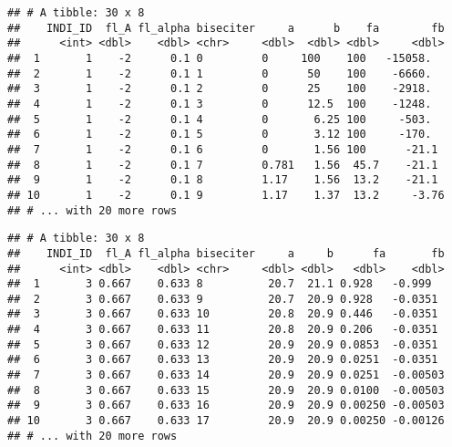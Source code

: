 \documentclass[
]{book}
\newenvironment{Shaded}{\begin{snugshade}}{\end{snugshade}}
\newcommand{\DecValTok}[1]{\textcolor[rgb]{0.00,0.00,0.81}{#1}}
\newcommand{\KeywordTok}[1]{\textcolor[rgb]{0.13,0.29,0.53}{\textbf{#1}}}
\newcommand{\NormalTok}[1]{#1}
\newcommand{\OperatorTok}[1]{\textcolor[rgb]{0.81,0.36,0.00}{\textbf{#1}}}
\newcommand{\StringTok}[1]{\textcolor[rgb]{0.31,0.60,0.02}{#1}}
\begin{document}
\begin{Shaded}
\end{Shaded}

\begin{verbatim}
## # A tibble: 30 x 8
##    INDI_ID  fl_A fl_alpha biseciter     a      b    fa        fb
##      <int> <dbl>    <dbl> <chr>     <dbl>  <dbl> <dbl>     <dbl>
##  1       1    -2      0.1 0         0     100    100   -15058.  
##  2       1    -2      0.1 1         0      50    100    -6660.  
##  3       1    -2      0.1 2         0      25    100    -2918.  
##  4       1    -2      0.1 3         0      12.5  100    -1248.  
##  5       1    -2      0.1 4         0       6.25 100     -503.  
##  6       1    -2      0.1 5         0       3.12 100     -170.  
##  7       1    -2      0.1 6         0       1.56 100      -21.1 
##  8       1    -2      0.1 7         0.781   1.56  45.7    -21.1 
##  9       1    -2      0.1 8         1.17    1.56  13.2    -21.1 
## 10       1    -2      0.1 9         1.17    1.37  13.2     -3.76
## # ... with 20 more rows
\end{verbatim}

\begin{Shaded}
\end{Shaded}

\begin{verbatim}
## # A tibble: 30 x 8
##    INDI_ID  fl_A fl_alpha biseciter     a     b      fa       fb
##      <int> <dbl>    <dbl> <chr>     <dbl> <dbl>   <dbl>    <dbl>
##  1       3 0.667    0.633 8          20.7  21.1 0.928   -0.999  
##  2       3 0.667    0.633 9          20.7  20.9 0.928   -0.0351 
##  3       3 0.667    0.633 10         20.8  20.9 0.446   -0.0351 
##  4       3 0.667    0.633 11         20.8  20.9 0.206   -0.0351 
##  5       3 0.667    0.633 12         20.9  20.9 0.0853  -0.0351 
##  6       3 0.667    0.633 13         20.9  20.9 0.0251  -0.0351 
##  7       3 0.667    0.633 14         20.9  20.9 0.0251  -0.00503
##  8       3 0.667    0.633 15         20.9  20.9 0.0100  -0.00503
##  9       3 0.667    0.633 16         20.9  20.9 0.00250 -0.00503
## 10       3 0.667    0.633 17         20.9  20.9 0.00250 -0.00126
## # ... with 20 more rows
\end{verbatim}
\end{document}
